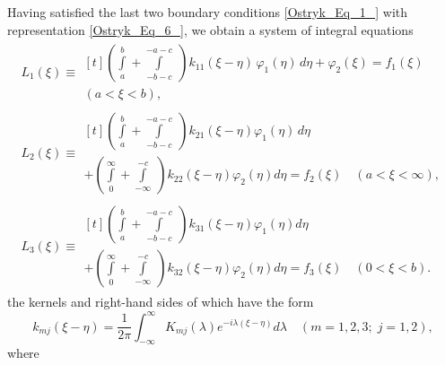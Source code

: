 Having satisfied the last two boundary conditions \eqref{Ostryk_Eq_1_} with representation \eqref{Ostryk_Eq_6_}, we obtain a system of integral equations
\begin{equation}\label{Ostryk_Eq_9_} 
\begin{array}{l}
	\displaystyle
	L_{1}(\xi) \equiv 
	\begin{multlined}[t]
		\left( \int\limits_{a}^{b} + \int\limits_{-b-c}^{-a-c} \;\right) 
		k_{11}(\xi - \eta) \, \varphi_{1}(\eta) \, d\eta 
		+ \varphi_{2}(\xi) = f_{1}(\xi) 
		\\[-1em]
		(a < \xi < b),
	\end{multlined}
	\\
	L_{2}(\xi) \equiv 
	\begin{multlined}[t]
		\left( \int\limits_{a}^{b} + \int\limits_{-b-c}^{-a-c} \;\right) 
		k_{21}(\xi - \eta)  \varphi_{1}(\eta) \, d\eta 
		\\[-1em]
		+ \left( \int\limits_{0}^{\infty} + \int\limits_{-\infty}^{-c} \;\right)
		k_{22}(\xi - \eta)  \varphi_{2}(\eta) d\eta = f_{2}(\xi) \quad (a < \xi < \infty),
	\end{multlined}
	\\
	L_{3}(\xi) \equiv 
	\begin{multlined}[t]
		\left( \int\limits_{a}^{b} + \int\limits_{-b-c}^{-a-c} \;\right) 
		k_{31}(\xi - \eta) \varphi_{1}(\eta)  d\eta 
		\\[-1em]
		+ \left( \int\limits_{0}^{\infty} + \int\limits_{-\infty}^{-c} \;\right)
		k_{32}(\xi - \eta)  \varphi_{2}(\eta)  d\eta = f_{3}(\xi)
		\quad
		(0 < \xi < b).
	\end{multlined}
\end{array}
\end{equation}
the kernels and right-hand sides of which have the form
\begin{equation} \label{Ostryk_Eq_10_} 
k_{mj} (\xi -\eta )=\dfrac{1}{2\pi } \int _{-\infty }^{\infty }K_{mj} (\lambda )e^{-i\lambda (\xi -\eta )} d\lambda  \quad  (m=1,2,3;\;  j=1,2),
\end{equation}  
where
